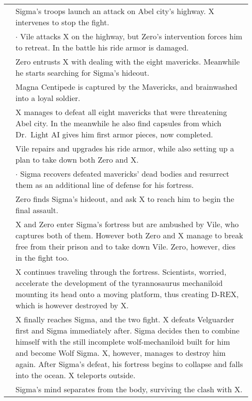 \begin{tabularx}{\linewidth}{l X}
	\addlinespace[1.5ex]
	\tabdot& Sigma's troops launch an attack on Abel city's highway. X intervenes to stop the fight.\\
	\tabline& $\cdot$ Vile attacks X on the highway, but Zero's intervention forces him to retreat. In the battle his ride armor is damaged.\\
	\tabdot& Zero entrusts X with dealing with the eight mavericks. Meanwhile he starts searching for Sigma's hideout.\\
	\tabdot& Magna Centipede is captured by the Mavericks, and brainwashed into a loyal soldier.\\
	\tabdot& X manages to defeat all eight mavericks that were threatening Abel city. In the meanwhile he also find capsules from which Dr.~Light AI gives him first armor pieces, now completed.\\
	\tabdot& Vile repairs and upgrades his ride armor, while also setting up a plan to take down both Zero and X.\\
	\tabline& $\cdot$ Sigma recovers defeated mavericks' dead bodies and resurrect them as an additional line of defense for his fortress.\\
	\tabdot& Zero finds Sigma's hideout, and ask X to reach him to begin the final assault.\\
	\tabdot& X and Zero enter Sigma's fortress but are ambushed by Vile, who captures both of them. However both Zero and X manage to break free from their prison and to take down Vile. Zero, however, dies in the fight too.\\
	\tabdot& X continues traveling through the fortress. Scientists, worried, accelerate the development of the tyrannosaurus mechaniloid mounting its head onto a moving platform, thus creating D-REX, which is however destroyed by X.\\
	\tabdot& X finally reaches Sigma, and the two fight. X defeats Velguarder first and Sigma immediately after. Sigma decides then to combine himself with the still incomplete wolf-mechaniloid built for him and become Wolf Sigma. X, however, manages to destroy him again. After Sigma's defeat, his fortress begins to collapse and falls into the ocean. X teleports outside.\\
	\tabdot& Sigma's mind separates from the body, surviving the clash with X.\\
	\midrule
	

\end{tabularx}
